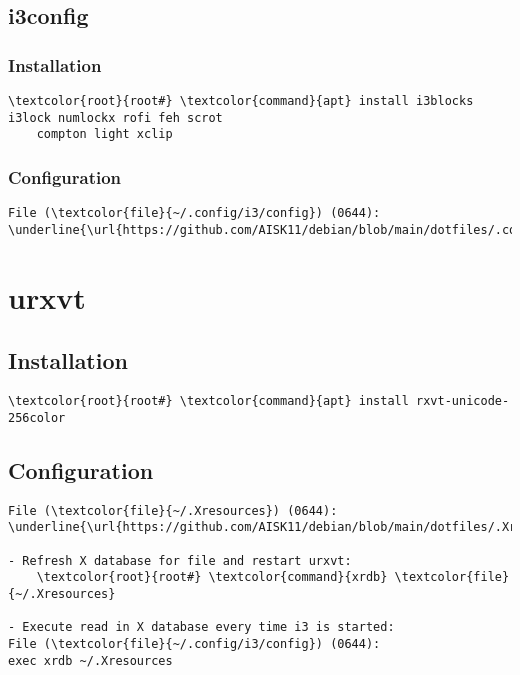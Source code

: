 \documentclass[10pt, a4paper, onecolumn, openany]{book} %
\begin{document}
\subsection{i3config}
\subsubsection{Installation}
\begin{Verbatim}[commandchars=\\\{\}]
    \textcolor{root}{root#} \textcolor{command}{apt} install i3blocks i3lock numlockx rofi feh scrot
    compton light xclip
\end{Verbatim}
\subsubsection{Configuration}
\begin{Verbatim}[commandchars=\\\{\}]   
File (\textcolor{file}{~/.config/i3/config}) (0644):
\underline{\url{https://github.com/AISK11/debian/blob/main/dotfiles/.config/i3/config}}
\end{Verbatim}

\section{urxvt}
\subsection{Installation}
\begin{Verbatim}[commandchars=\\\{\}]
    \textcolor{root}{root#} \textcolor{command}{apt} install rxvt-unicode-256color
\end{Verbatim}

\subsection{Configuration}
\begin{Verbatim}[commandchars=\\\{\}]
File (\textcolor{file}{~/.Xresources}) (0644):
\underline{\url{https://github.com/AISK11/debian/blob/main/dotfiles/.Xresources}}

- Refresh X database for file and restart urxvt:
    \textcolor{root}{root#} \textcolor{command}{xrdb} \textcolor{file}{~/.Xresources}

- Execute read in X database every time i3 is started:
File (\textcolor{file}{~/.config/i3/config}) (0644):
exec xrdb ~/.Xresources    
\end{Verbatim}
\end{document}
